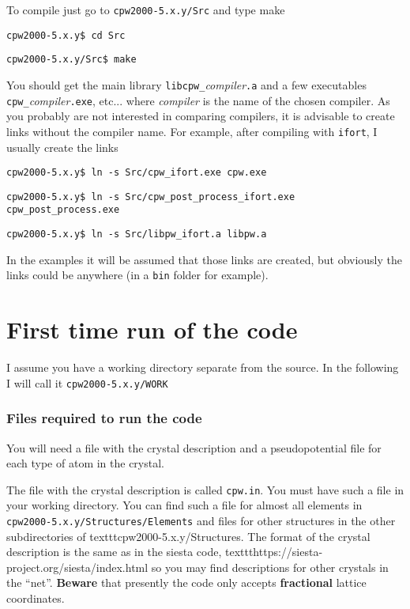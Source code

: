 \documentclass[11pt]{article}
\begin{document}
To compile just go to \texttt{cpw2000-5.x.y/Src} and type make

\noindent\texttt{cpw2000-5.x.y\$ cd Src}

\noindent\texttt{cpw2000-5.x.y/Src\$ make}

You should get the main library \texttt{libcpw{\_}}\textit{compiler}\texttt{.a}
and a few executables \texttt{cpw{\_}}\textit{compiler}\texttt{.exe}, etc...
where \textit{compiler} is the name of the chosen compiler.
As you probably are not interested in comparing compilers,
it is advisable to create links without the compiler name.
For example, after compiling with \texttt{ifort}, I usually create the links

\noindent\texttt{cpw2000-5.x.y\$ ln -s Src/cpw\_ifort.exe cpw.exe}

\noindent\texttt{cpw2000-5.x.y\$ ln -s Src/cpw\_post\_process\_ifort.exe cpw\_post\_process.exe}

\noindent\texttt{cpw2000-5.x.y\$ ln -s Src/libpw\_ifort.a libpw.a}

In the examples it will be assumed that those links are created, but obviously
the links could be anywhere (in a \texttt{bin} folder for example).




\section{First time run of the code}
\label{sec:run}

I assume you have a working directory separate from the source.  In the following I will call it
\texttt{cpw2000-5.x.y/WORK}


\subsubsection{Files required to run the code}


You will need a file with the crystal description and a pseudopotential file for each type of atom
in the crystal.

The file with the crystal description is called \texttt{cpw.in}.  You must have such a file
in your working directory.  You can find such a file for almost all elements in
\texttt{cpw2000-5.x.y/Structures/Elements}
and files for other structures in the other subdirectories of texttt{cpw2000-5.x.y/Structures}.
The format of the crystal description is the same as in the {\sc siesta} code,
texttt{https://siesta-project.org/siesta/index.html} so you may find descriptions
for other crystals in the ``net''.  {\bf Beware} that presently the code only accepts
{\bf fractional} lattice coordinates.
\end{document}
